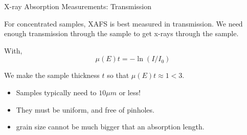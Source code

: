 \begin{slide}{X-ray Absorption Measurements: Transmission}

\vmm
    \begin{center}
    \end{center}
  
  For concentrated samples, XAFS is best measured in transmission.
  We need enough transmission through the sample to get x-rays through the
  sample.

  \pause

  With,  \[{ \mu(E)t  = - \ln(I/I_0) }\]
  
  We make the sample thickness ${t}$ so that ${ \mu(E)t \approx 1  < 3 }$.

  \begin{itemize}
  \pause \item  Samples typically need to $10{\mu}m$ or less!  
  \pause \item  They must be uniform, and free of pinholes.  
  \pause \item  grain size cannot be much bigger that an absorption length.
  \end{itemize}

\pause

\begin{center}
\end{center}

\vfill
\end{slide} 
